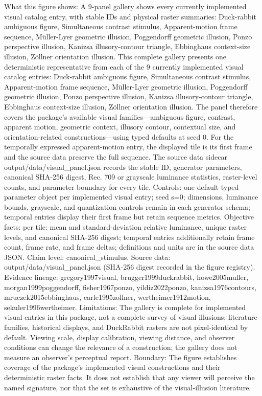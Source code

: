 \documentclass[
  english,
]{article}
\begin{document}
What this figure shows: A 9-panel gallery shows every currently
implemented visual catalog entry, with stable IDs and physical raster
summaries: Duck-rabbit ambiguous figure, Simultaneous contrast stimulus,
Apparent-motion frame sequence, Müller-Lyer geometric illusion,
Poggendorff geometric illusion, Ponzo perspective illusion, Kanizsa
illusory-contour triangle, Ebbinghaus context-size illusion, Zöllner
orientation illusion. This complete gallery presents one deterministic
representative from each of the 9 currently implemented visual catalog
entries: Duck-rabbit ambiguous figure, Simultaneous contrast stimulus,
Apparent-motion frame sequence, Müller-Lyer geometric illusion,
Poggendorff geometric illusion, Ponzo perspective illusion, Kanizsa
illusory-contour triangle, Ebbinghaus context-size illusion, Zöllner
orientation illusion. The panel therefore covers the package's available
visual families---ambiguous figure, contrast, apparent motion, geometric
context, illusory contour, contextual size, and orientation-related
constructions---using typed defaults at seed 0. For the temporally
expressed apparent-motion entry, the displayed tile is its first frame
and the source data preserve the full sequence. The source data sidecar
output/data/visual\_panel.json records the stable ID, generator
parameters, canonical SHA-256 digest, Rec. 709 or grayscale luminance
statistics, raster-level counts, and parameter boundary for every tile.
Controls: one default typed parameter object per implemented visual
entry; seed s=0; dimensions, luminance bounds, grayscale, and
quantization controls remain in each generator schema; temporal entries
display their first frame but retain sequence metrics. Objective facts:
per tile: mean and standard-deviation relative luminance, unique raster
levels, and canonical SHA-256 digest; temporal entries additionally
retain frame count, frame rate, and frame deltas; definitions and units
are in the source data JSON. Claim level: canonical\_stimulus. Source
data: output/data/visual\_panel.json (SHA-256 digest recorded in the
figure registry). Evidence lineage: gregory1997visual,
brugger1999duckrabbit, howe2005muller, morgan1999poggendorff,
fisher1967ponzo, yildiz2022ponzo, kanizsa1976contours,
mruczek2015ebbinghaus, earle1995zollner, wertheimer1912motion,
sekuler1996wertheimer. Limitations: The gallery is complete for
implemented visual entries in this package, not a complete survey of
visual illusions; literature families, historical displays, and
DuckRabbit rasters are not pixel-identical by default. Viewing scale,
display calibration, viewing distance, and observer conditions can
change the relevance of a construction; the gallery does not measure an
observer's perceptual report. Boundary: The figure establishes coverage
of the package's implemented visual constructions and their
deterministic raster facts. It does not establish that any viewer will
perceive the named signature, nor that the set is exhaustive of the
visual-illusion literature.
\end{document}

